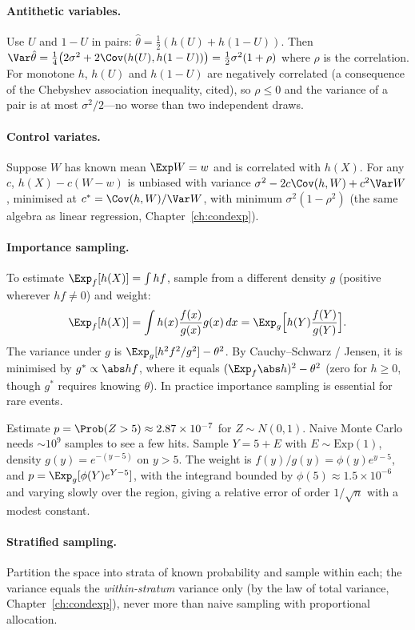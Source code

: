 \paragraph{Antithetic variables.} Use $U$ and $1-U$ in pairs: $\hat\theta=\frac12(h(U)+h(1-U))$. Then
$\Var\hat\theta=\tfrac14\bigl(2\sigma^2+2\Cov(h(U),h(1-U))\bigr)=\tfrac12\sigma^2(1+\rho)$ where $\rho$ is
the correlation. For monotone $h$, $h(U)$ and $h(1-U)$ are negatively correlated
(a consequence of the Chebyshev association inequality, cited), so $\rho\le0$ and the variance of
a pair is at most $\sigma^2/2$---no worse than two independent draws.

\paragraph{Control variates.} Suppose $W$ has known mean $\Exp W=w$ and is correlated with $h(X)$. For any
$c$, $h(X)-c(W-w)$ is unbiased with variance
$\sigma^2-2c\Cov(h,W)+c^2\Var W$, minimised at $c^*=\Cov(h,W)/\Var W$, with minimum
$\sigma^2(1-\rho^2)$ (the same algebra as linear regression, Chapter~\ref{ch:condexp}).

\paragraph{Importance sampling.} To estimate $\Exp_f[h(X)]=\int hf$, sample from a different density $g$
(positive wherever $hf\ne0$) and weight:
\[
\Exp_f[h(X)]=\int h(x)\frac{f(x)}{g(x)}g(x)\,dx=\Exp_g\Bigl[h(Y)\frac{f(Y)}{g(Y)}\Bigr].
\]
The variance under $g$ is $\Exp_g[h^2f^2/g^2]-\theta^2$. By Cauchy--Schwarz / Jensen, it is
minimised by $g^*\propto\abs hf$, where it equals $(\Exp_f\abs h)^2-\theta^2$ (zero for $h\ge0$,
though $g^*$ requires knowing $\theta$). In practice importance sampling is essential for rare events.

\begin{example}
Estimate $p=\Prob(Z>5)\approx2.87\times10^{-7}$ for $Z\sim N(0,1)$. Naive Monte Carlo needs $\sim10^{9}$
samples to see a few hits. Sample $Y=5+E$ with $E\sim\mathrm{Exp}(1)$, density $g(y)=e^{-(y-5)}$ on $y>5$.
The weight is $f(y)/g(y)=\phi(y)e^{y-5}$, and $p=\Exp_g[\phi(Y)e^{Y-5}]$, with the integrand bounded
by $\phi(5)\approx1.5\times10^{-6}$ and varying slowly over the region, giving a relative
error of order $1/\sqrt n$ with a modest constant.
\end{example}

\paragraph{Stratified sampling.} Partition the space into strata of known probability and sample
within each; the variance equals the \emph{within-stratum} variance only (by the law of total
variance, Chapter~\ref{ch:condexp}), never more than naive sampling with proportional allocation.

